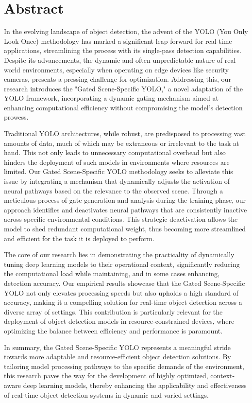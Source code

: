 \section*{Abstract} 						%

In the evolving landscape of object detection, the advent of the YOLO (You Only Look Once) methodology has marked a significant leap forward for real-time applications, streamlining the process with its single-pass detection capabilities. Despite its advancements, the dynamic and often unpredictable nature of real-world environments, especially when operating on edge devices like security cameras, presents a pressing challenge for optimization. Addressing this, our research introduces the "Gated Scene-Specific YOLO," a novel adaptation of the YOLO framework, incorporating a dynamic gating mechanism aimed at enhancing computational efficiency without compromising the model's detection prowess.

Traditional YOLO architectures, while robust, are predisposed to processing vast amounts of data, much of which may be extraneous or irrelevant to the task at hand. This not only leads to unnecessary computational overhead but also hinders the deployment of such models in environments where resources are limited. Our Gated Scene-Specific YOLO methodology seeks to alleviate this issue by integrating a mechanism that dynamically adjusts the activation of neural pathways based on the relevance to the observed scene. Through a meticulous process of gate generation and analysis during the training phase, our approach identifies and deactivates neural pathways that are consistently inactive across specific environmental conditions. This strategic deactivation allows the model to shed redundant computational weight, thus becoming more streamlined and efficient for the task it is deployed to perform.

The core of our research lies in demonstrating the practicality of dynamically tuning deep learning models to their operational context, significantly reducing the computational load while maintaining, and in some cases enhancing, detection accuracy. Our empirical results showcase that the Gated Scene-Specific YOLO not only elevates processing speeds but also upholds a high standard of accuracy, making it a compelling solution for real-time object detection across a diverse array of settings. This contribution is particularly relevant for the deployment of object detection models in resource-constrained devices, where optimizing the balance between efficiency and performance is paramount.

In summary, the Gated Scene-Specific YOLO represents a meaningful stride towards more adaptable and resource-efficient object detection solutions. By tailoring model processing pathways to the specific demands of the environment, this research paves the way for the development of highly optimized, context-aware deep learning models, thereby enhancing the applicability and effectiveness of real-time object detection systems in dynamic and varied settings.

\clearpage
